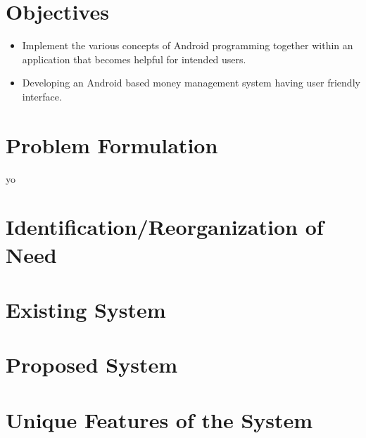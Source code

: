 \section{Objectives}

\begin{itemize}
	\item Implement the various concepts of Android programming together within an application that becomes helpful for intended users.
	\item Developing an Android based money management system having user friendly interface.
\end{itemize}
 

\section{Problem Formulation}
yo

\section{Identification/Reorganization of Need}

\section{Existing System}

\section{Proposed System}

\section{Unique Features of the System}



